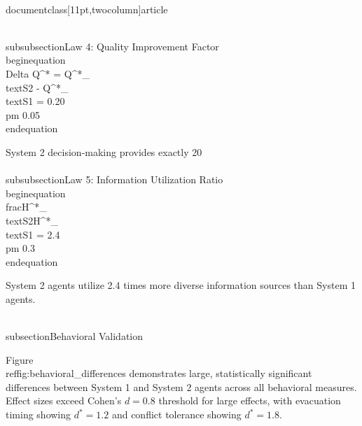 \\documentclass[11pt,twocolumn]{article}
\begin{document}
\\subsubsection{Law 4: Quality Improvement Factor}
\\begin{equation}
\\Delta Q^* = Q^*_{\\text{S2}} - Q^*_{\\text{S1}} = 0.20 \\pm 0.05
\\end{equation}

System 2 decision-making provides exactly 20\\%

\\subsubsection{Law 5: Information Utilization Ratio}
\\begin{equation}
\\frac{H^*_{\\text{S2}}}{H^*_{\\text{S1}}} = 2.4 \\pm 0.3
\\end{equation}

System 2 agents utilize 2.4 times more diverse information sources than System 1 agents.

\\subsection{Behavioral Validation}

Figure~\\ref{fig:behavioral_differences} demonstrates large, statistically significant differences between System 1 and System 2 agents across all behavioral measures. Effect sizes exceed Cohen's $d = 0.8$ threshold for large effects, with evacuation timing showing $d^* = 1.2$ and conflict tolerance showing $d^* = 1.8$.
\end{document}
